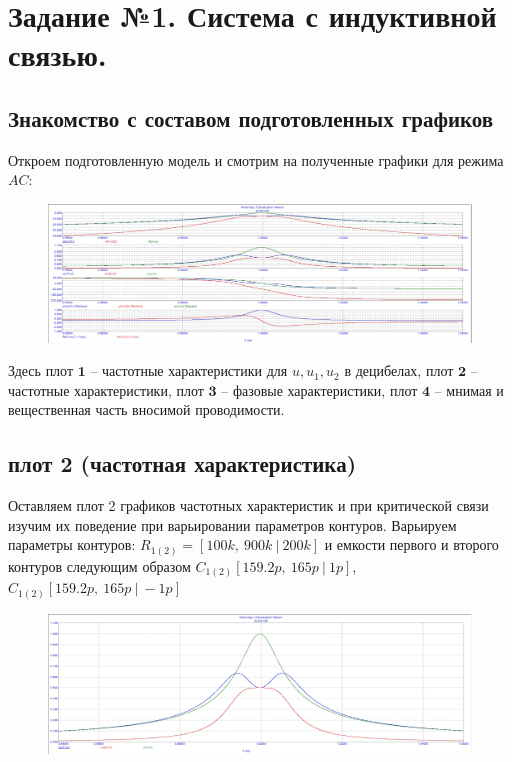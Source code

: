 \documentclass[a4paper, 14pt]{extarticle}%
\begin{document}
\section{Задание №1. Система с индуктивной связью.}

\subsection{Знакомство с составом подготовленных графиков}

Откроем подготовленную модель и смотрим на полученные графики для режима $AC$:

\begin{figure}[h!]
	\centering
			\includegraphics[width=1.1\linewidth]{1.1.jpg}
	\label{A}
\end{figure}

Здесь $\textbf{плот 1}$ -- частотные характеристики для $u, u_1, u_2$ в децибелах, $\textbf{плот 2}$ -- частотные характеристики, $\textbf{плот 3}$ -- фазовые характеристики, $\textbf{плот 4}$ -- мнимая и вещественная часть вносимой проводимости.


\subsection{плот 2 (частотная характеристика)}

Оставляем плот 2 графиков частотных характеристик и при критической связи изучим их поведение при варьировании параметров контуров.
\newline
Варьируем параметры контуров:
\newline
$R_{1(2)} = [100k,  \: 900k \:| \: 200k]$ и емкости первого и второго контуров следующим образом $C_{1(2)} [159.2p, \: 165p \: | \: 1p]$, $C_{1(2)} [159.2p, \: 165p \: | \: -1p]$

\begin{figure}[h!]
	\centering
			\includegraphics[width=1.1\linewidth]{1.2.jpg}
	\label{A}
\end{figure}
\end{document}
